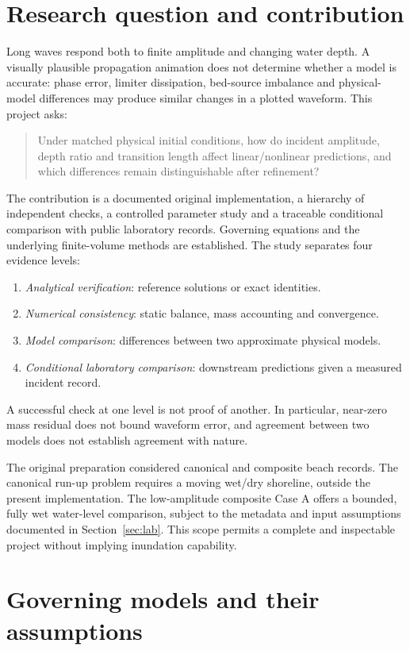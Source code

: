 \documentclass[11pt]{article}
\begin{document}
\section{Research question and contribution}
Long waves respond both to finite amplitude and changing water depth. A visually
plausible propagation animation does not determine whether a model is accurate:
phase error, limiter dissipation, bed-source imbalance and physical-model differences
may produce similar changes in a plotted waveform. This project asks:
\begin{quote}
Under matched physical initial conditions, how do incident amplitude, depth ratio
and transition length affect linear/nonlinear predictions, and which differences
remain distinguishable after refinement?
\end{quote}
The contribution is a documented original implementation, a hierarchy of
independent checks, a controlled parameter study and a traceable conditional
comparison with public laboratory records. Governing equations and the underlying
finite-volume methods are established. The study separates four evidence levels:
\begin{enumerate}
\item \emph{Analytical verification}: reference solutions or exact identities.
\item \emph{Numerical consistency}: static balance, mass accounting and convergence.
\item \emph{Model comparison}: differences between two approximate physical models.
\item \emph{Conditional laboratory comparison}: downstream predictions given a measured incident record.
\end{enumerate}
A successful check at one level is not proof of another. In particular, near-zero
mass residual does not bound waveform error, and agreement between two models does
not establish agreement with nature.

The original preparation considered canonical and composite beach records. The
canonical run-up problem requires a moving wet/dry shoreline, outside the present
implementation. The low-amplitude composite Case A offers a bounded, fully wet
water-level comparison, subject to the metadata and input assumptions documented
in Section~\ref{sec:lab}. This scope permits a complete and inspectable project
without implying inundation capability.

\section{Governing models and their assumptions}
\end{document}
